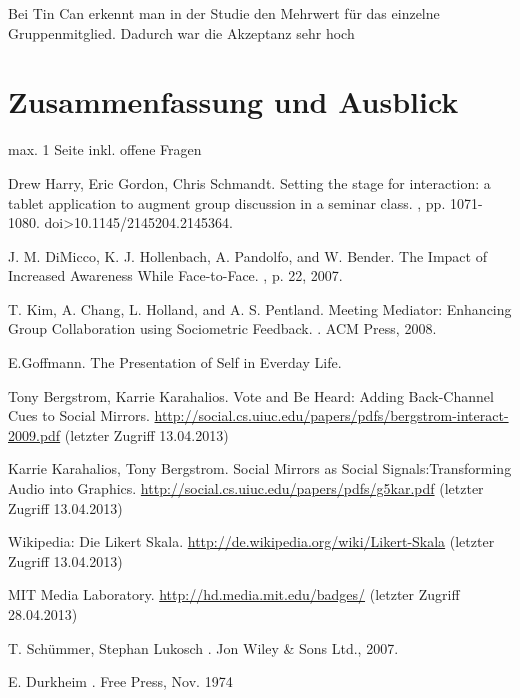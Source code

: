 \documentclass{seminarvorlage}
\begin{document}
Bei Tin Can erkennt man in der Studie den Mehrwert für das einzelne Gruppenmitglied. Dadurch war die Akzeptanz sehr hoch


\section{Zusammenfassung und Ausblick}
max. 1 Seite
inkl. offene Fragen
% 

\begin{thebibliography}{[9]}

Drew Harry, Eric Gordon, Chris Schmandt.
\newblock Setting the stage for interaction: a tablet application to augment group discussion in a seminar class. 
, pp. 1071-1080. doi>10.1145/2145204.2145364. 

J. M. DiMicco, K. J. Hollenbach, A. Pandolfo, and W. Bender.
\newblock The Impact of Increased Awareness While Face-to-Face.
, p. 22, 2007.

T. Kim, A. Chang, L. Holland, and A. S. Pentland.
\newblock Meeting Mediator: Enhancing Group Collaboration using Sociometric Feedback. 
. ACM Press, 2008.

E.Goffmann.
\newblock The Presentation of Self in Everday Life.

Tony Bergstrom, Karrie Karahalios. 
\newblock Vote and Be Heard: Adding Back-Channel Cues to Social Mirrors.
 \url {http://social.cs.uiuc.edu/papers/pdfs/bergstrom-interact-2009.pdf} (letzter Zugriff 13.04.2013)

Karrie Karahalios, Tony Bergstrom. 
\newblock Social Mirrors as Social Signals:Transforming Audio into Graphics.
 \url {http://social.cs.uiuc.edu/papers/pdfs/g5kar.pdf} (letzter Zugriff 13.04.2013)

Wikipedia: Die Likert Skala.
\newblock \url {http://de.wikipedia.org/wiki/Likert-Skala} (letzter Zugriff 13.04.2013)

 MIT Media Laboratory. 
\newblock \url {http://hd.media.mit.edu/badges/} (letzter Zugriff 28.04.2013)

T. Schümmer, Stephan Lukosch
. Jon Wiley \& Sons Ltd., 2007.

E. Durkheim
. Free Press, Nov. 1974

\end{thebibliography}
\end{document}
